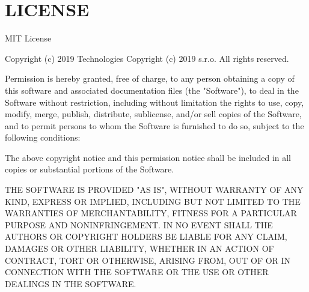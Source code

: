 \chapter{LICENSE}
\hypertarget{md__hey_tea_9_2_library_2_package_cache_2com_8unity_8ide_8rider_0d3_80_824_2_l_i_c_e_n_s_e}{}\label{md__hey_tea_9_2_library_2_package_cache_2com_8unity_8ide_8rider_0d3_80_824_2_l_i_c_e_n_s_e}
MIT License

Copyright (c) 2019  Technologies Copyright (c) 2019  s.\+r.\+o. All rights reserved.

Permission is hereby granted, free of charge, to any person obtaining a copy of this software and associated documentation files (the "{}\+Software"{}), to deal in the Software without restriction, including without limitation the rights to use, copy, modify, merge, publish, distribute, sublicense, and/or sell copies of the Software, and to permit persons to whom the Software is furnished to do so, subject to the following conditions\+:

The above copyright notice and this permission notice shall be included in all copies or substantial portions of the Software.

THE SOFTWARE IS PROVIDED "{}\+AS IS"{}, WITHOUT WARRANTY OF ANY KIND, EXPRESS OR IMPLIED, INCLUDING BUT NOT LIMITED TO THE WARRANTIES OF MERCHANTABILITY, FITNESS FOR A PARTICULAR PURPOSE AND NONINFRINGEMENT. IN NO EVENT SHALL THE AUTHORS OR COPYRIGHT HOLDERS BE LIABLE FOR ANY CLAIM, DAMAGES OR OTHER LIABILITY, WHETHER IN AN ACTION OF CONTRACT, TORT OR OTHERWISE, ARISING FROM, OUT OF OR IN CONNECTION WITH THE SOFTWARE OR THE USE OR OTHER DEALINGS IN THE SOFTWARE. 